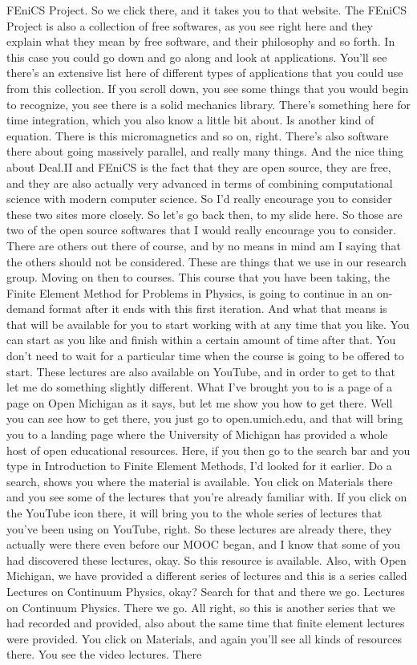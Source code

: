 \documentclass[10pt]{article}
\begin{document}
FEniCS Project. So we click there, and it takes you to that website. The FEniCS Project is also a collection of free softwares, as you see right here and they explain what they mean by free software, and their philosophy and so forth. In this case you could go down and go along and look at applications. You'll see there's an extensive list here of different types of applications that you could use from this collection. If you scroll down, you see some things that you would begin to recognize, you see there is a solid mechanics library. There's something here for time integration, which you also know a little bit about. Is another kind of equation. There is this micromagnetics and so on, right. There's also software there about going massively parallel, and really many things. And the nice thing about Deal.II and FEniCS is the fact that they are open source, they are free, and they are also actually very advanced in terms of combining computational science with modern computer science. So I'd really encourage you to consider these two sites more closely. So let's go back then, to my slide here. So those are two of the open source softwares that I would really encourage you to consider. There are others out there of course, and by no means in mind am I saying that the others should not be considered. These are things that we use in our research group. Moving on then to courses. This course that you have been taking, the Finite Element Method for Problems in Physics, is going to continue in an on-demand format after it ends with this first iteration. And what that means is that will be available for you to start working with at any time that you like. You can start as you like and finish within a certain amount of time after that. You don't need to wait for a particular time when the course is going to be offered to start. These lectures are also available on YouTube, and in order to get to that let me do something slightly different. What I've brought you to is a page of a page on Open Michigan as it says, but let me show you how to get there. Well you can see how to get there, you just go to open.umich.edu, and that will bring you to a landing page where the University of Michigan has provided a whole host of open educational resources. Here, if you then go to the search bar and you type in Introduction to Finite Element Methods, I'd looked for it earlier. Do a search, shows you where the material is available. You click on Materials there and you see some of the lectures that you're already familiar with. If you click on the YouTube icon there, it will bring you to the whole series of lectures that you've been using on YouTube, right. So these lectures are already there, they actually were there even before our MOOC began, and I know that some of you had discovered these lectures, okay. So this resource is available. Also, with Open Michigan, we have provided a different series of lectures and this is a series called Lectures on Continuum Physics, okay? Search for that and there we go. Lectures on Continuum Physics. There we go. All right, so this is another series that we had recorded and provided, also about the same time that finite element lectures were provided. You click on Materials, and again you'll see all kinds of resources there. You see the video lectures. There 
\end{document}
